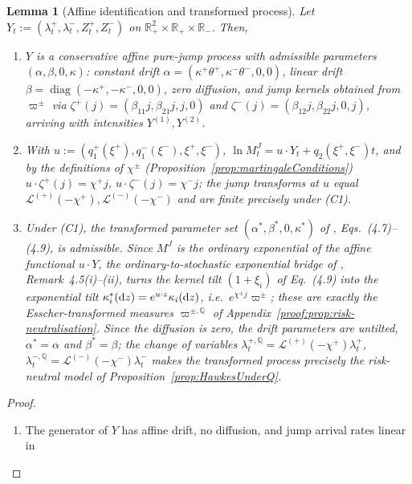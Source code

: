 \documentclass[11pt,a4paper]{article}
\numberwithin{equation}{section}
\newtheorem{lemma}[theorem]{Lemma}
\theoremstyle{remark}
\theoremstyle{definition}
\providecommand{\R}{{\mathbb{R}}}
\newcommand{\q}{{\mathbb Q}}
\newcommand{\dd}{{\rm d}}
\newcommand{\Lp}{\mathcal{L}^{(+)}}
\newcommand{\Lm}{\mathcal{L}^{(-)}}
\newcommand{\lQp}{\lambda^{+,\q}}
\newcommand{\lQm}{\lambda^{-,\q}}
\begin{document}
{\begin{lemma}[Affine identification and transformed process]
  \label{lemma:2}
Let $Y_t:=(\lambda^{+}_t,\lambda^{-}_t,Z^{+}_t,Z^{-}_t)$ on
$\R_{+}^{2}\times\R_{+}\times\R_{-}$. Then,
\begin{enumerate}[label=(\alph*)]
\item $Y$ is a conservative affine pure-jump process \citep{Mayerhofer2011} with admissible parameters $(\alpha,\beta,0,\kappa)$: constant drift $\alpha=(\kappa^{+}\theta^{+}, \kappa^{-}\theta^{-},0,0)$, linear drift $\beta=\operatorname{diag}(-\kappa^{+},-\kappa^{-},0,0)$, zero diffusion, and jump kernels obtained from $\varpi^{\pm}$ via $\zeta^{+}(j)=(\beta_{11}j,\beta_{21}j,j,0)$ and $\zeta^{-}(j)=(\beta_{12}j,\beta_{22}j,0,j)$, arriving with intensities $Y^{(1)}, Y^{(2)}$.
\item With $u:=(q_1^{+}(\xi^{+}),q_1^{-}(\xi^{-}),\xi^{+},\xi^{-})$,
$\ln M^{J}_t=u\cdot Y_t+q_2(\xi^{+},\xi^{-})t$, and by the definitions
of $\chi^{\pm}$ (Proposition~\ref{prop:martingaleConditions})
$u\cdot\zeta^{+}(j)=\chi^{+}j$, $u\cdot\zeta^{-}(j)=\chi^{-}j$; the jump transforms at $u$ equal
$\Lp(-\chi^{+}),\Lm(-\chi^{-})$ and are finite precisely under \textup{(C1)}.
\item Under \textup{(C1)}, the transformed parameter set
  $(\alpha^{*},\beta^{*},0,\kappa^{*})$ of \cite{Mayerhofer2011},
  Eqs.~(4.7)--(4.9), is admissible.
  Since $M^{J}$ is the
  \emph{ordinary} exponential of the affine functional $u\cdot Y$, the
  ordinary-to-stochastic exponential bridge of \cite{Mayerhofer2011},
  Remark~4.5(i)--(ii), turns the kernel tilt $(1+\xi_i)$ of Eq.~(4.9)
  into the exponential tilt $\kappa^{*}_i(\dd z)=e^{u\cdot
    z}\kappa_i(\dd z)$, i.e.\ $e^{\chi^{\pm}j}\varpi^{\pm}$;
  these are exactly the Esscher-transformed measures $\varpi^{\pm,\q}$
  of Appendix~\ref{proof:prop:risk-neutralisation}.
  Since the diffusion is zero, the drift parameters are untilted, $\alpha^{*}=\alpha$ and $\beta^{*}=\beta$; the change of variables
  $\lQp_t=\Lp(-\chi^{+})\lambda^{+}_t$,
  $\lQm_t=\Lm(-\chi^{-})\lambda^{-}_t$ makes the transformed process
  precisely the risk-neutral model of
  Proposition~\ref{prop:HawkesUnderQ}.
\end{enumerate}
\end{lemma}
\begin{proof}
  \begin{enumerate}[label=(\alph*)]
\item The generator of $Y$ has affine drift, no diffusion, and jump arrival rates linear in

\end{enumerate}
\end{proof}}
\end{document}
